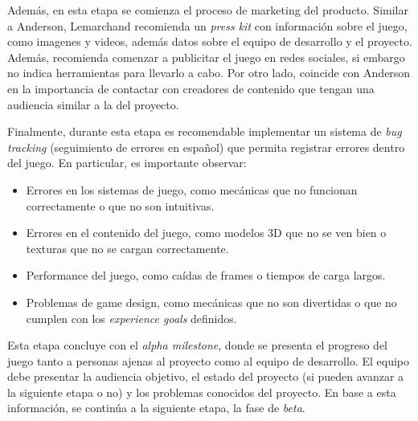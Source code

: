 \par Además, en esta etapa se comienza el proceso de marketing del producto. Similar a Anderson, Lemarchand recomienda un \textit{press kit} con información sobre el juego, como imagenes y videos, además datos sobre el equipo de desarrollo y el proyecto. Además, recomienda comenzar a publicitar el juego en redes sociales, si embargo no indica herramientas para llevarlo a cabo. Por otro lado, coincide con Anderson en la importancia de contactar con creadores de contenido que tengan una audiencia similar a la del proyecto.
\par Finalmente, durante esta etapa es recomendable implementar un sistema de \textit{bug tracking} (seguimiento de errores en español) que permita registrar errores dentro del juego. En particular, es importante observar:
\begin{itemize}
    \item Errores en los sistemas de juego, como mecánicas que no funcionan correctamente o que no son intuitivas.
    \item Errores en el contenido del juego, como modelos 3D que no se ven bien o texturas que no se cargan correctamente.
    \item Performance del juego, como caídas de frames o tiempos de carga largos.
    \item Problemas de game design, como mecánicas que no son divertidas o que no cumplen con los \textit{experience goals} definidos.
\end{itemize}
\bigbreak
\par Esta etapa concluye con el \textit{alpha milestone}, donde se presenta el progreso del juego tanto a personas ajenas al proyecto como al equipo de desarrollo. El equipo debe presentar la audiencia objetivo, el estado del proyecto (si pueden avanzar a la siguiente etapa o no) y los problemas conocidos del proyecto. En base a esta información, se continúa a la siguiente etapa, la fase de \textit{beta}.
%
%
